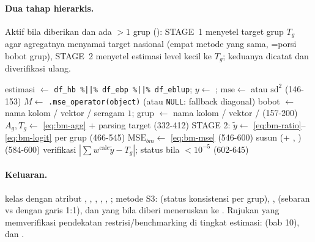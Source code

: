 \paragraph{Dua tahap hierarkis.} Aktif bila  diberikan
dan ada $>1$ grup (): STAGE~1 menyetel target grup
$T_g$ agar agregatnya menyamai target nasional (empat metode yang sama,
=porsi bobot grup), STAGE~2 menyetel estimasi level kecil ke
$T_g$; keduanya dicatat  dan diverifikasi ulang.
\begin{algorithm}[htbp]
\caption{\texttt{benchmark\_sae} --- alur sebenarnya (\texttt{R/benchmark.R:120-660})}\label{alg:bm}
estimasi $\leftarrow$ \texttt{df\_hb \%||\% df\_ebp \%||\% df\_eblup};
  $y\leftarrow$ ; $\mathrm{mse}\leftarrow$  atau $\mathrm{sd}^2$ (146-153)\;
$M\leftarrow$ \texttt{.mse\_operator(object)} (atau \texttt{NULL}: fallback diagonal)\;
bobot $\leftarrow$ nama kolom / vektor / seragam $1$; grup $\leftarrow$ nama kolom / vektor /  (157-200)\;
$A_g,T_g\leftarrow$ \eqref{eq:bm-agg} + parsing target (332-412)\;
STAGE 2: $\tilde y\leftarrow$ \eqref{eq:bm-ratio}--\eqref{eq:bm-logit} per grup (466-545)\;
$\mathrm{MSE}_{bm}\leftarrow$ \eqref{eq:bm-mse} (546-600)\;
susun  (+ , ) (584-600)\;
verifikasi $|\sum w^{\text{calc}}\tilde y-T_g|$; status  bila $<10^{-5}$ (602-645)\;
\end{algorithm}

\paragraph{Keluaran.}  kelas 
dengan atribut , , ,
, , ;
metode S3:  (status konsistensi per grup), ,
 (sebaran  vs  dengan garis 1:1),
dan  yang bila diberi  meneruskan ke .
Rujukan yang memverifikasi pendekatan restrisi/benchmarking di tingkat
estimasi: \citet{rao2015small} (bab 10), \citet{you2002pseudo} dan
\citet{wang2008small}.

